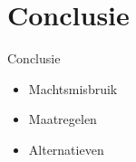 \documentclass{beamer}
\begin{document}
\section{Conclusie}
\begin{frame}{Conclusie}

    \begin{itemize}
        \item Machtsmisbruik 
        \item Maatregelen
        \item Alternatieven 
    \end{itemize}
\end{frame}
\end{document}
